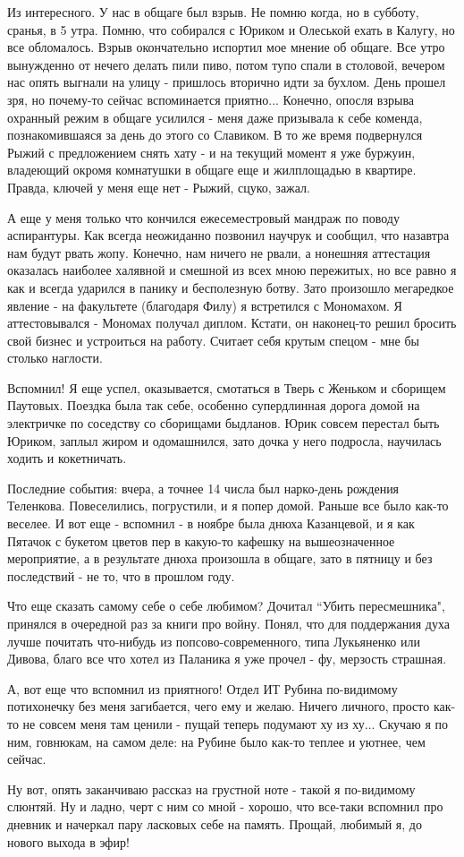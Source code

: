 \documentclass[12pt,a4paper]{article}
\begin{document}
Из интересного. У нас в общаге был взрыв. Не помню когда, но в субботу, сранья, в 5 утра. Помню, что собирался с Юриком и Олеськой ехать в Калугу, но все обломалось. Взрыв окончательно испортил мое мнение об общаге. Все утро вынужденно от нечего делать пили пиво, потом тупо спали в столовой, вечером нас опять выгнали на улицу - пришлось вторично идти за бухлом. День прошел зря, но почему-то сейчас вспоминается приятно... Конечно, опосля взрыва охранный режим в общаге усилился - меня даже призывала к себе коменда, познакомившаяся за день до этого со Славиком. В то же время подвернулся Рыжий с предложением снять хату - и на текущий момент я уже буржуин, владеющий окромя комнатушки в общаге еще и жилплощадью в квартире. Правда, ключей у меня еще нет - Рыжий, сцуко, зажал.

А еще у меня только что кончился ежесеместровый мандраж по поводу аспирантуры. Как всегда неожиданно позвонил научрук и сообщил, что назавтра нам будут рвать жопу. Конечно, нам ничего не рвали, а нонешняя аттестация оказалась наиболее халявной и смешной из всех мною пережитых, но все равно я как и всегда ударился в панику и бесполезную ботву. Зато произошло мегаредкое явление - на факультете (благодаря Филу) я встретился с Мономахом. Я аттестовывался - Мономах получал диплом. Кстати, он наконец-то решил бросить свой бизнес и устроиться на работу. Считает себя крутым спецом - мне бы столько наглости.

Вспомнил! Я еще успел, оказывается, смотаться в Тверь с Женьком и сборищем Паутовых. Поездка была так себе, особенно супердлинная дорога домой на электричке по соседству со сборищами быдланов. Юрик совсем перестал быть Юриком, заплыл жиром и одомашнился, зато дочка у него подросла, научилась ходить и кокетничать.

Последние события: вчера, а точнее 14 числа был нарко-день рождения Теленкова. Повеселились, погрустили, и я попер домой. Раньше все было как-то веселее. И вот еще - вспомнил - в ноябре была днюха Казанцевой, и я как Пятачок с букетом цветов пер в какую-то кафешку на вышеозначенное мероприятие, а в результате днюха произошла в общаге, зато в пятницу и без последствий - не то, что в прошлом году.

Что еще сказать самому себе о себе любимом? Дочитал ``Убить пересмешника", принялся в очередной раз за книги про войну. Понял, что для поддержания духа лучше почитать что-нибудь из попсово-современного, типа Лукьяненко или Дивова, благо все что хотел из Паланика я уже прочел - фу, мерзость страшная.

А, вот еще что вспомнил из приятного! Отдел ИТ Рубина по-видимому потихонечку без меня загибается, чего ему и желаю. Ничего личного, просто как-то не совсем меня там ценили - пущай теперь подумают ху из ху... Скучаю я по ним, говнюкам, на самом деле: на Рубине было как-то теплее и уютнее, чем сейчас. 

Ну вот, опять заканчиваю рассказ на грустной ноте - такой я по-видимому слюнтяй. Ну и ладно, черт с ним со мной - хорошо, что все-таки вспомнил про дневник и начеркал пару ласковых себе на память. Прощай, любимый я, до нового выхода в эфир!
\end{document}

